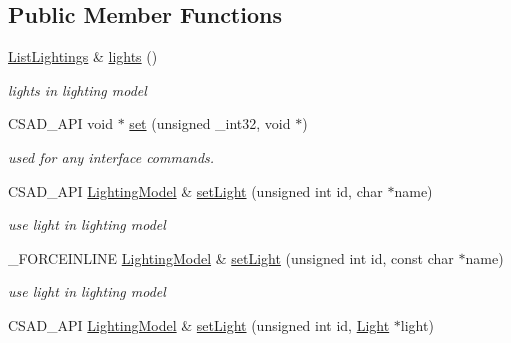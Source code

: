 \subsection*{Public Member Functions}
\begin{DoxyCompactItemize}
\item 
\hypertarget{classcsad_1_1_lighting_model_ab597f6f4d2e18b8ff581c0dfe6d02639}{\hyperlink{classbt_1_1_void_vector}{List\-Lightings} \& \hyperlink{classcsad_1_1_lighting_model_ab597f6f4d2e18b8ff581c0dfe6d02639}{lights} ()}\label{classcsad_1_1_lighting_model_ab597f6f4d2e18b8ff581c0dfe6d02639}

\begin{DoxyCompactList}\small\item\em lights in lighting model \end{DoxyCompactList}\item 
\hypertarget{classcsad_1_1_lighting_model_abbb9dd1011eba62aff6f9afc5ae1415e}{C\-S\-A\-D\-\_\-\-A\-P\-I void $\ast$ \hyperlink{classcsad_1_1_lighting_model_abbb9dd1011eba62aff6f9afc5ae1415e}{set} (unsigned \-\_\-int32, void $\ast$)}\label{classcsad_1_1_lighting_model_abbb9dd1011eba62aff6f9afc5ae1415e}

\begin{DoxyCompactList}\small\item\em used for any interface commands. \end{DoxyCompactList}\item 
\hypertarget{classcsad_1_1_lighting_model_a9b28bbef8850d6361593d37b63ec8668}{C\-S\-A\-D\-\_\-\-A\-P\-I \hyperlink{classcsad_1_1_lighting_model}{Lighting\-Model} \& \hyperlink{classcsad_1_1_lighting_model_a9b28bbef8850d6361593d37b63ec8668}{set\-Light} (unsigned int id, char $\ast$name)}\label{classcsad_1_1_lighting_model_a9b28bbef8850d6361593d37b63ec8668}

\begin{DoxyCompactList}\small\item\em use light in lighting model \end{DoxyCompactList}\item 
\hypertarget{classcsad_1_1_lighting_model_a226c35135524c3882081629f8f0696b6}{\-\_\-\-F\-O\-R\-C\-E\-I\-N\-L\-I\-N\-E \hyperlink{classcsad_1_1_lighting_model}{Lighting\-Model} \& \hyperlink{classcsad_1_1_lighting_model_a226c35135524c3882081629f8f0696b6}{set\-Light} (unsigned int id, const char $\ast$name)}\label{classcsad_1_1_lighting_model_a226c35135524c3882081629f8f0696b6}

\begin{DoxyCompactList}\small\item\em use light in lighting model \end{DoxyCompactList}\item 
\hypertarget{classcsad_1_1_lighting_model_ac3687ba56ddf122657bf3a148e74d934}{C\-S\-A\-D\-\_\-\-A\-P\-I \hyperlink{classcsad_1_1_lighting_model}{Lighting\-Model} \& \hyperlink{classcsad_1_1_lighting_model_ac3687ba56ddf122657bf3a148e74d934}{set\-Light} (unsigned int id, \hyperlink{classcsad_1_1_light}{Light} $\ast$light)}\label{classcsad_1_1_lighting_model_ac3687ba56ddf122657bf3a148e74d934}


\end{DoxyCompactItemize}
